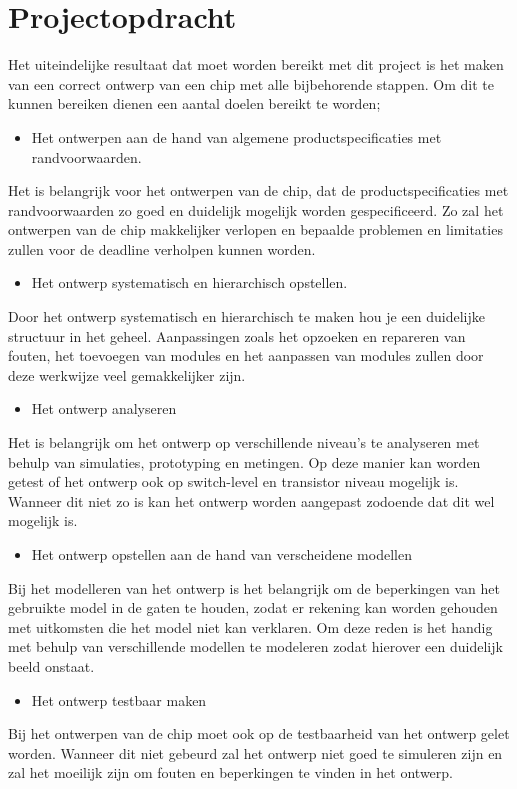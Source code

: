 \documentclass{scrartcl}
\begin{document}
\section{Projectopdracht}
Het uiteindelijke resultaat dat moet worden bereikt met dit project is het maken van een correct ontwerp van een chip met alle bijbehorende stappen. Om dit te kunnen bereiken dienen een aantal doelen bereikt te worden;
\begin {itemize}
\item Het ontwerpen aan de hand van algemene productspecificaties met randvoorwaarden.
\end {itemize}
\quad Het is belangrijk voor het ontwerpen van de chip, dat de productspecificaties met randvoorwaarden zo goed en duidelijk mogelijk worden gespecificeerd. 
Zo zal het ontwerpen van de chip makkelijker verlopen en bepaalde problemen en limitaties zullen voor de deadline verholpen kunnen worden.
\begin {itemize}
\item Het ontwerp systematisch en hierarchisch opstellen.
\end {itemize}
\quad Door het ontwerp systematisch en hierarchisch te maken hou je een duidelijke structuur in het geheel. Aanpassingen zoals het opzoeken en repareren van fouten, het toevoegen van modules en het aanpassen van modules zullen door deze werkwijze veel gemakkelijker zijn.
\begin {itemize}
\item Het ontwerp analyseren 
\end {itemize}
\quad Het is belangrijk om het ontwerp op verschillende niveau's te analyseren met behulp van simulaties, prototyping en metingen. Op deze manier kan worden getest of het ontwerp ook op switch-level en transistor niveau mogelijk is. Wanneer dit niet zo is kan het ontwerp worden aangepast zodoende dat dit wel mogelijk is.
\begin {itemize}
\item Het ontwerp opstellen aan de hand van verscheidene modellen
\end {itemize}
\quad Bij het modelleren van het ontwerp is het belangrijk om de beperkingen van het gebruikte model in de gaten te houden, zodat er rekening kan worden gehouden met uitkomsten die het model niet kan verklaren. Om deze reden is het handig met behulp van verschillende modellen te modeleren zodat hierover een duidelijk beeld onstaat.
\begin {itemize}
\item Het ontwerp testbaar maken
\end {itemize}
\quad Bij het ontwerpen van de chip moet ook op de testbaarheid van het ontwerp gelet worden. Wanneer dit niet gebeurd zal het ontwerp niet goed te simuleren zijn en zal het moeilijk zijn om fouten en beperkingen te vinden in het ontwerp.
\end{document}
